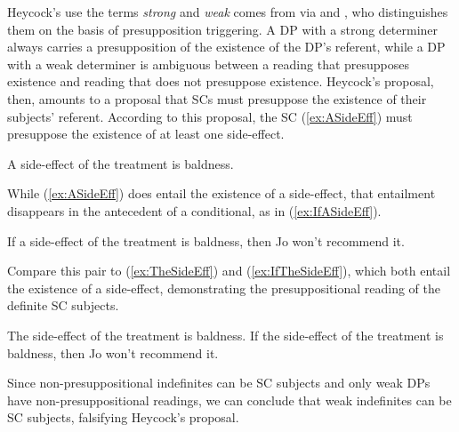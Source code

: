 \documentclass[
]{RCL}
\begin{document}
Heycock's use the terms \textit{strong} and \textit{weak} comes from \citet{milsark1974existential} via \citet{dehoop1992case} and \citet{diesing1992indefinites}, who distinguishes them on the basis of presupposition triggering.
A DP with a strong determiner always carries a presupposition of the existence of the DP's referent, while a DP with a weak determiner is ambiguous between a reading that presupposes existence and reading that does not presuppose existence.
Heycock's proposal, then, amounts to a proposal that SCs must presuppose the existence of their subjects' referent.
According to this proposal, the SC (\ref{ex:ASideEff}) must presuppose the existence of at least one side-effect.
\begin{exe}
	\ex\label{ex:ASideEff} A side-effect of the treatment is baldness.
\end{exe}
While (\ref{ex:ASideEff}) does entail the existence of a side-effect, that entailment disappears in the antecedent of a conditional, as in (\ref{ex:IfASideEff}).
\begin{exe}
	\ex\label{ex:IfASideEff} If a side-effect of the treatment is baldness, then Jo won't recommend it.
\end{exe}
Compare this pair to (\ref{ex:TheSideEff}) and (\ref{ex:IfTheSideEff}), which both entail the existence of a side-effect, demonstrating the presuppositional reading of the definite SC subjects.
\begin{exe}
	\ex\label{ex:TheSideEff} The side-effect of the treatment is baldness.
	\ex\label{ex:IfTheSideEff} If the side-effect of the treatment is baldness, then Jo won't recommend it.
\end{exe}
Since non-presuppositional indefinites can be SC subjects and only weak DPs have non-presuppositional readings, we can conclude that weak indefinites can be SC subjects, falsifying Heycock's proposal.
\end{document}
